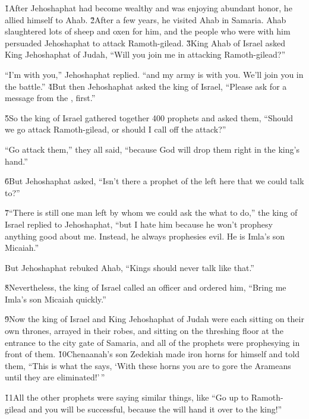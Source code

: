 \v{1}After Jehoshaphat had become wealthy and was enjoying abundant honor, he allied himself to Ahab. \v{2}After a few years, he visited Ahab in Samaria. Ahab slaughtered lots of sheep and oxen for him, and the people who were with him persuaded Jehoshaphat to attack Ramoth-gilead. \v{3}King Ahab of Israel asked King Jehoshaphat of Judah, ``Will you join me in attacking Ramoth-gilead?''

``I'm with you,'' Jehoshaphat replied. ``and my army is with you. We'll join you in the battle.'' \v{4}But then Jehoshaphat asked the king of Israel, ``Please ask for a message from the , first.''

\v{5}So the king of Israel gathered together 400 prophets and asked them, ``Should we go attack Ramoth-gilead, or should I call off the attack?''

``Go attack them,'' they all said, ``because God will drop them right in the king's hand.''

\v{6}But Jehoshaphat asked, ``Isn't there a prophet of the  left here that we could talk to?''

\v{7}``There is still one man left by whom we could ask the  what to do,'' the king of Israel replied to Jehoshaphat, ``but I hate him because he won't prophesy anything good about me. Instead, he always prophesies evil. He is Imla's son Micaiah.''

But Jehoshaphat rebuked Ahab, ``Kings should never talk like that.''

\v{8}Nevertheless, the king of Israel called an officer and ordered him, ``Bring me Imla's son Micaiah quickly.''

\v{9}Now the king of Israel and King Jehoshaphat of Judah were each sitting on their own thrones, arrayed in their robes, and sitting on the threshing floor at the entrance to the city gate of Samaria, and all of the prophets were prophesying in front of them. \v{10}Chenaanah's son Zedekiah made iron horns for himself and told them, ``This is what the  says, `With these horns you are to gore the Arameans until they are eliminated!'\,''

\v{11}All the other prophets were saying similar things, like ``Go up to Ramoth-gilead and you will be successful, because the  will hand it over to the king!''

